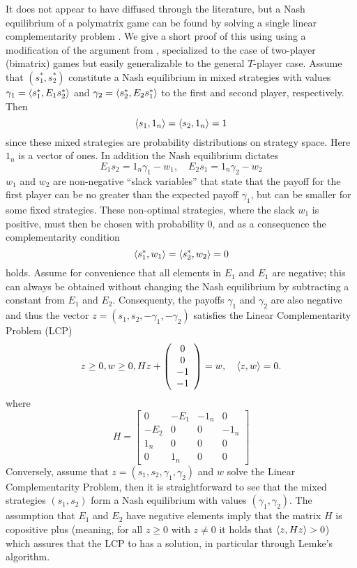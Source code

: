It does not appear to have diffused through the literature, but a Nash equilibrium of a polymatrix game can be found by solving a single linear complementarity problem \citep{miller1991copositive}. We give a short proof of this using using a modification of the argument from \citep{miller1991copositive}, specialized to the case of two-player (bimatrix) games but easily generalizable to the general $T$-player case. Assume that $(s^*_1,s^*_2)$ constitute a Nash equilibrium in mixed strategies with values $\gamma_1 = \left \langle s^*_1,E_1 s^*_2 \right \rangle$ and  $\gamma_2 = \left \langle s^*_2,E_2 s^*_1 \right \rangle$ to the first and second player, respectively. Then
\[
  \left \langle s_1,1_n \right \rangle =
  \left \langle s_2,1_n \right \rangle =
  1
\]
since these mixed strategies are probability distributions on strategy space. Here $1_n$ is a vector of ones. In addition the Nash equilibrium dictates
\[
  E_1 s_2 = 1_n \gamma_1 - w_1
  ,\quad
  E_2 s_1 = 1_n \gamma_2  - w_2
\]
$w_1$ and $w_2$ are non-negative ``slack variables'' that state that the payoff for the first player can be no greater than the expected payoff $\gamma_1$, but can be smaller for some fixed strategies. These non-optimal strategies, where the slack $w_1$ is positive, must then be chosen with probability 0, and as a consequence the complementarity condition
\[
  \left \langle s^*_1,w_1 \right \rangle = \left \langle s^*_2,w_2 \right \rangle = 0
\]
holds. Assume for convenience that all elements in $E_1$ and $E_1$ are negative; this can always be obtained without changing the Nash equilibrium by subtracting a constant from $E_1$ and $E_2$. Consequenty, the payoffs $\gamma_1$ and $\gamma_2$ are also negative and thus the vector $z = (s_1,s_2,-\gamma_1,-\gamma_2)$ satisfies the Linear Complementarity Problem (LCP)
\begin{equation}
  z \geq 0,
  w \geq 0 ,
  H
  z
  +
  \left(
    \begin{array}{c}
      0 \\
      0 \\
      -1 \\
      -1
    \end{array}
  \right)
  =
  w
  ,
  \quad
  \left \langle z,w \right \rangle = 0
  .  \label{eq:lcp}
\end{equation}
where
\[
  H =
  \left[
    \begin{array}{cccc}
      0 & -E_1 & -1_n & 0 \\ -E_2 & 0 & 0 & -1_n \\
      1_n & 0 & 0 & 0 \\
      0 & 1_n & 0 & 0
    \end{array}
  \right]
\]
Conversely, assume that $z=(s_1,s_2,\gamma_1,\gamma_2)$ and $w$ solve the Linear Complementarity Problem, then it is straightforward to see that the mixed strategies $(s_1,s_2)$ form a Nash equilibrium with values $(\gamma_1,\gamma_2)$. The assumption that $E_1$ and $E_2$ have negative elements imply that the matrix $H$ is copositive plus (meaning, for all $z\geq0$ with $z\neq0$ it holds that $\left \langle z,Hz \right \rangle>0$) which assures that the LCP to has a solution, in particular through Lemke's algorithm.

